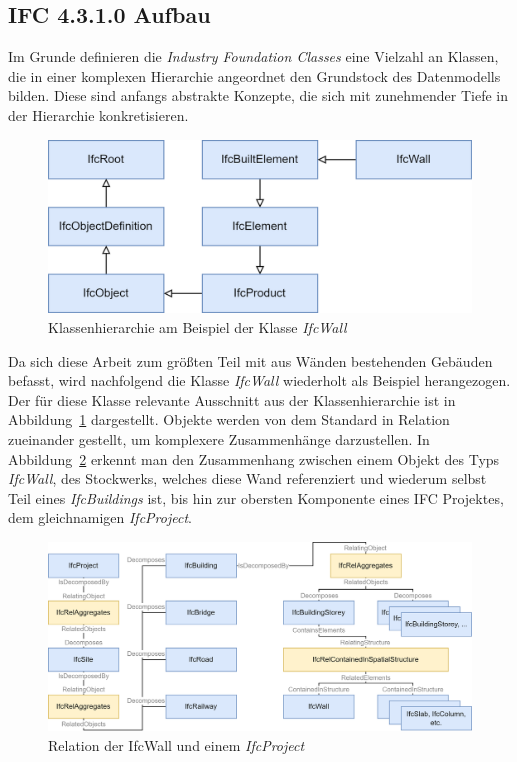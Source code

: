 \subsection{IFC 4.3.1.0 Aufbau}
Im Grunde definieren die \textit{Industry Foundation Classes} eine Vielzahl an Klassen, die in einer komplexen Hierarchie angeordnet den Grundstock des Datenmodells bilden.
Diese sind anfangs abstrakte Konzepte, die sich mit zunehmender Tiefe in der Hierarchie konkretisieren.
\begin{figure}[ht]
    \centering
    \includegraphics[width=0.6\columnwidth]{fig/Hierarchie_IfcWall_300.drawio.png}
    \caption{Klassenhierarchie am Beispiel der Klasse \textit{IfcWall}}\label{fig:IfcWall_Hierarchie}
\end{figure}
Da sich diese Arbeit zum größten Teil mit aus Wänden bestehenden Gebäuden befasst, wird nachfolgend die Klasse \textit{IfcWall} wiederholt als Beispiel herangezogen.
Der für diese Klasse relevante Ausschnitt aus der Klassenhierarchie ist in Abbildung~\ref{fig:IfcWall_Hierarchie} dargestellt.
Objekte werden von dem Standard in Relation zueinander gestellt, um komplexere Zusammenhänge darzustellen.
In Abbildung~\ref{fig:IFC_Relationships} erkennt man den Zusammenhang zwischen einem Objekt des Typs \textit{IfcWall}, des Stockwerks, welches diese Wand referenziert und wiederum selbst Teil eines \textit{IfcBuildings} ist, bis hin zur obersten Komponente eines IFC Projektes, dem gleichnamigen \textit{IfcProject}.

\begin{figure}[h]
    \centering
    \includegraphics[width=0.9\columnwidth]{fig/IFC_Relationships_300.drawio.png}
    \caption{Relation der IfcWall und einem \textit{IfcProject}}\label{fig:IFC_Relationships}
\end{figure}

